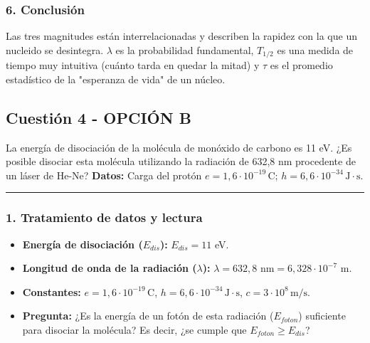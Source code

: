 \subsubsection*{6. Conclusión}
Las tres magnitudes están interrelacionadas y describen la rapidez con la que un nucleido se desintegra. $\lambda$ es la probabilidad fundamental, $T_{1/2}$ es una medida de tiempo muy intuitiva (cuánto tarda en quedar la mitad) y $\tau$ es el promedio estadístico de la "esperanza de vida" de un núcleo.

\newpage

\subsection{Cuestión 4 - OPCIÓN B}
\label{subsec:6B_2005_jun_cv}

\begin{cajaenunciado}
La energía de disociación de la molécula de monóxido de carbono es 11 eV. ¿Es posible disociar esta molécula utilizando la radiación de 632,8 nm procedente de un láser de He-Ne?
\textbf{Datos:} Carga del protón $e=1,6\cdot10^{-19}\,\text{C}$; $h=6,6\cdot10^{-34}\,\text{J}\cdot\text{s}$.
\end{cajaenunciado}
\hrule

\subsubsection*{1. Tratamiento de datos y lectura}
\begin{itemize}
    \item \textbf{Energía de disociación ($E_{dis}$):} $E_{dis} = 11$ eV.
    \item \textbf{Longitud de onda de la radiación ($\lambda$):} $\lambda = 632,8 \text{ nm} = 6,328 \cdot 10^{-7}$ m.
    \item \textbf{Constantes:} $e=1,6\cdot10^{-19}\,\text{C}$, $h=6,6\cdot10^{-34}\,\text{J}\cdot\text{s}$, $c=3\cdot10^8\,\text{m/s}$.
    \item \textbf{Pregunta:} ¿Es la energía de un fotón de esta radiación ($E_{foton}$) suficiente para disociar la molécula? Es decir, ¿se cumple que $E_{foton} \ge E_{dis}$?
\end{itemize}

